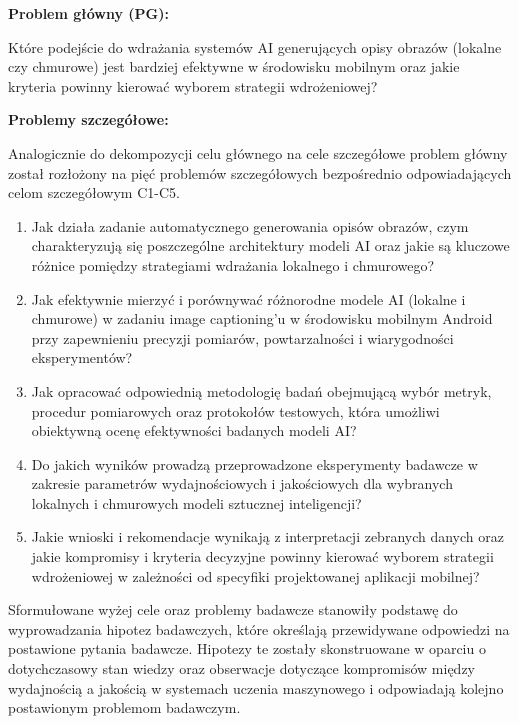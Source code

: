 \vspace{0.3cm}
\noindent
\textbf{Problem główny (PG):} 

Które podejście do wdrażania systemów AI generujących opisy obrazów (lokalne 
czy chmurowe) jest bardziej efektywne w środowisku mobilnym oraz jakie kryteria powinny kierować wyborem strategii wdrożeniowej?

\vspace{0.3cm}
\noindent
\textbf{Problemy szczegółowe:}

Analogicznie do dekompozycji celu głównego na cele szczegółowe problem główny został rozłożony na pięć 
problemów szczegółowych bezpośrednio odpowiadających celom szczegółowym C1-C5.

\vspace{0.3cm}
\begin{enumerate}[leftmargin=*, label=\textbf{P\arabic*.}, itemsep=3pt]
    \item Jak działa zadanie automatycznego generowania opisów obrazów,
    czym charakteryzują się poszczególne architektury modeli AI
    oraz jakie są kluczowe różnice pomiędzy strategiami wdrażania lokalnego i chmurowego?
    
    \item Jak efektywnie mierzyć i porównywać różnorodne modele AI (lokalne i chmurowe) 
    w zadaniu image captioning'u w środowisku mobilnym Android przy zapewnieniu precyzji pomiarów, 
    powtarzalności i wiarygodności eksperymentów?
    
    \item Jak opracować odpowiednią metodologię badań obejmującą wybór metryk, procedur pomiarowych 
    oraz protokołów testowych, która umożliwi obiektywną ocenę efektywności badanych modeli AI?
    
    \item Do jakich wyników prowadzą przeprowadzone eksperymenty badawcze w zakresie parametrów
    wydajnościowych i jakościowych dla wybranych lokalnych i chmurowych modeli sztucznej inteligencji?
    
    \item Jakie wnioski i rekomendacje wynikają z interpretacji zebranych danych oraz jakie 
    kompromisy i kryteria decyzyjne powinny kierować wyborem strategii wdrożeniowej 
    w zależności od specyfiki projektowanej aplikacji mobilnej?
\end{enumerate}

\noindent
Sformułowane wyżej cele oraz problemy badawcze stanowiły podstawę do wyprowadzania 
hipotez badawczych, które określają przewidywane odpowiedzi na postawione pytania badawcze. 
Hipotezy te zostały skonstruowane w oparciu o dotychczasowy stan wiedzy oraz obserwacje dotyczące kompromisów
między wydajnością a jakością w systemach uczenia maszynowego i odpowiadają kolejno postawionym problemom badawczym.

